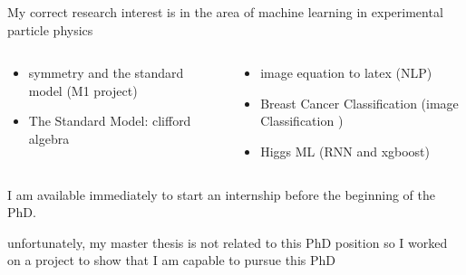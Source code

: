 \documentclass[11pt,aspectratio=169]{beamer}
\begin{document}
\begin{frame}{\underline{\secname}}

	My correct research interest is in the area of machine learning in experimental particle physics

	
		\begin{columns}
		\begin{column}{0.5\linewidth}
	
	\begin{itemize} 			  \setlength\itemsep{0em}

		\item symmetry and the standard model (M1 project)
		\item The Standard Model: clifford algebra
		
		
	\end{itemize}	

			\end{column}
		
		\begin{column}{0.5\linewidth}
		
	\begin{itemize}			  \setlength\itemsep{0em}

		\item image equation to latex (NLP)
		\item Breast Cancer Classification (image Classification )
		\item Higgs ML (RNN and xgboost)

	\end{itemize}
			\end{column}
	\end{columns}
	
\vspace{20pt}
	I am available immediately to start an internship before the beginning of the PhD.

	\vspace{20pt}

unfortunately, my master thesis is not related to this PhD position so I worked on a project to show that I am capable to pursue this PhD 





	
\end{frame}
\end{document}
